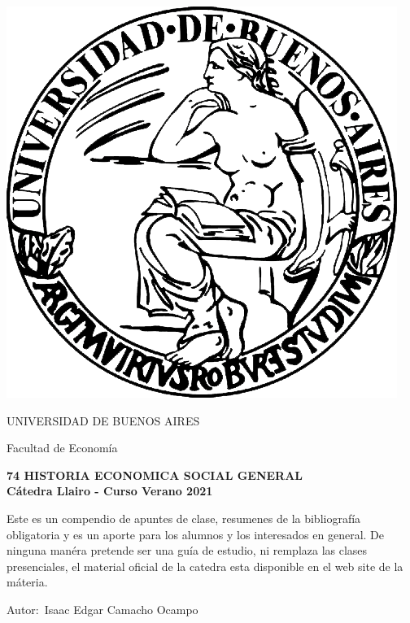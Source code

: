 \documentclass[12pt]{book}
\begin{document}
\thispagestyle{empty}

\begin {center}

\includegraphics[scale=.4]{uba.png}

\medskip
UNIVERSIDAD DE BUENOS AIRES

Facultad de Econom\'ia


\vspace{3cm}


\textbf{\large 74 HISTORIA ECONOMICA SOCIAL GENERAL}
\\

\textbf{Cátedra Llairo - Curso Verano 2021}

\vspace{2cm}


Este es un compendio de apuntes de clase, resumenes de la bibliograf\'ia obligatoria y es un aporte para los alumnos y los interesados en general.
De ninguna man\'era pretende ser una gu\'ia de estudio, ni remplaza las clases presenciales, el material oficial de la catedra esta disponible en el web site de la m\'ateria.
\\

\end {center}


\vspace{2.5cm}

\noindent Autor:\,	Isaac Edgar Camacho Ocampo
 
\end{document}
